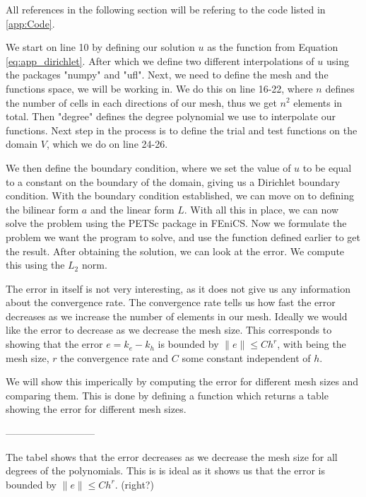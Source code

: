 
All references in the following section will be refering to the code listed in \ref{app:Code}.

We start on line 10 by defining our solution $u$ as the function from Equation \eqref{eq:app_dirichlet}.
After which we define two different interpolations of $u$ using the packages "numpy" and "ufl". 
Next, we need to define the mesh and the functions space, we will be working in. 
We do this on line 16-22, where $n$ defines the number of cells in each directions of our mesh, thus we get $n^2$ elements in total.
Then "degree" defines the degree polynomial we use to interpolate our functions.
Next step in the process is to define the trial and test functions on the domain $V$, which we do on line 24-26.

We then define the boundary condition, where we set the value of $u$ to be equal to a constant on the boundary of the domain,
giving us a Dirichlet boundary condition. With the boundary condition established, we can move on to defining the bilinear form $a$ and the linear form $L$.
With all this in place, we can now solve the problem using the PETSc package in FEniCS. Now we formulate the problem we want the program to solve, and use the function defined earlier to get the result. 
After obtaining the solution, we can look at the error. We compute this using the $L_2$ norm.

The error in itself is not very interesting, as it does not give us any information about the convergence rate.
The convergence rate tells us how fast the error decreases as we increase the number of elements in our mesh.
Ideally we would like the error to decrease as we decrease the mesh size. This corresponds to showing that the error $e=k_e-k_h$ is bounded by $\|e\|\leq Ch^r$, 
with being the mesh size, $r$ the convergence rate and $C$ some constant independent of $h$.

We will show this imperically by computing the error for different mesh sizes and comparing them. 
This is done by defining a function which returns a table showing the error for different mesh sizes.

---------------------------

The tabel shows that the error decreases as we decrease the mesh size for all degrees of the polynomials.
This is is ideal as it shows us that the error is bounded by $\|e\|\leq Ch^r$. (right?)